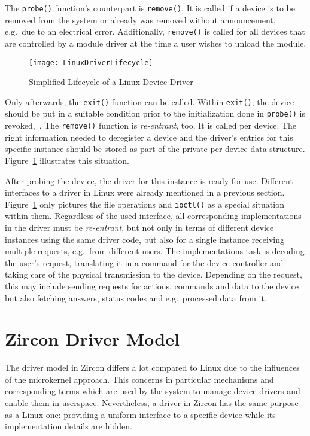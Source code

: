 The \texttt{probe()} function's counterpart is \texttt{remove()}.
It is called if a device is to be removed from the system or already was removed without announcement, e.g.\ due to an electrical error.
Additionally, \texttt{remove()} is called for all devices that are controlled by a module driver at the time a user wishes to unload the module.
%
\begin{figure} [t]
    \centering
    \texttt{[image: LinuxDriverLifecycle]}
    \caption{Simplified Lifecycle of a Linux Device Driver}
    \label{pic:linux-lifecycle}
\end{figure}
%
%
Only afterwards, the \texttt{exit()} function can be called.
Within \texttt{exit()}, the device should be put in a suitable condition prior to the initialization done in \texttt{probe()} is revoked\cite{lfd430},~\cite{quade2016Linux}.
The \texttt{remove()} function is \textit{re-entrant}, too.
It is called per device.
The right information needed to deregister a device and the driver's entries for this specific instance should be stored as part of the private per-device data structure.
Figure~\ref{pic:linux-lifecycle} illustrates this situation.

After probing the device, the driver for this instance is ready for use.
Different interfaces to a driver in Linux were already mentioned in a previous section.
Figure~\ref{pic:linux-lifecycle} only pictures the file operations and \texttt{ioctl()} as a special situation within them.
Regardless of the used interface, all corresponding implementations in the driver must be \textit{re-entrant}, but not only in terms of different device instances using the same driver code, but also for a single instance receiving multiple requests, e.g.\ from different users.
The implementations task is decoding the user's request, translating it in a command for the device controller and taking care of the physical transmission to the device.
Depending on the request, this may include sending requests for actions, commands and data to the device but also fetching answers, status codes and e.g.\ processed data from it\cite{quade2016Linux}.


\section{Zircon Driver Model}
The driver model in Zircon differs a lot compared to Linux due to the influences of the microkernel approach.
This concerns in particular mechanisms and corresponding terms which are used by the system to manage device drivers and enable them in userspace.
Nevertheless, a driver in Zircon has the same purpose as a Linux one: providing a uniform interface to a specific device while its implementation details are hidden\cite{zircon-ddk-gettingstarted}. 

